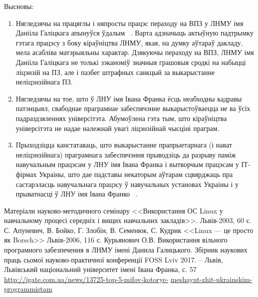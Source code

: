 \documentclass[10pt, a5paper]{article}
\begin{document}
Высновы:

\begin{enumerate}
  \item Нягледзячы на працяглы і няпросты працэс пераходу на ВПЗ у ЛНМУ імя Данііла Галіцкага апынуўся ўдалым ~\cite{Zlobin-3}. Варта адзначыць актыўную падтрымку гэтага працэсу з боку кіраўніцтва ЛНМУ, якая, на думку аўтараў дакладу, мела асабліва матэрыяльны характар. Дзякуючы пераходу на ВПЗ, ЛНМУ імя Данііла Галіцкага не толькі зэканоміў значныя грашовыя сродкі на набыцці ліцэнзій на ПЗ, але і пазбег \linebreak штрафных санкцый за выкарыстанне неліцэнзійнага ПЗ.
  \item Нягледзячы на тое, што ў ЛНУ імя Івана Франка ёсць неабходны кадравы патэнцыял, свабоднае праграмнае забеспячэнне выкарыстоўваецца не ва ўсіх падраздзяленнях універсітэта. Абумоўлена гэта тым, што кіраўніцтва універсітэта не надае належнай увагі ліцэнзійнай чысціні  праграм.
  \item Прыходзіцца канстатаваць, што выкарыстанне прапрыетарнага (і нават неліцэнзійнага) праграмнага забеспячэння прыводзіць да разрыву паміж навучальным працэсам у ЛНУ імя Івана Франка і вытворчым працэсам у ІТ-фірмах Украіны, што дае падставы некаторым аўтарам сцвярджаць пра састарэласць навучальнага працэсу ў навучальных установах Украіны і у прыватнасці ў ЛНУ імя Івана Франко ~\cite{Zlobin-4}.
\end{enumerate}

\begin{thebibliography}{20}

Матеріали науково-методичного семінару <<Використання ОС Linux у навчальному процесі середніх і вищих навчальних закладів>>. Львів-2003, 60 с.
С. Апуневич, В. Бойко, Г. Злобін, В. Семенюк, С. Кудрик <<Linux — це просто як Borsch>> Львів-2006, 116 с.
Курьянович О.В. Використання вільного програмного забезпечення в ЛНМУ імені Данила Галицького. Збірник наукових праць  сьомої науково-практичної конференції FOSS Lviv 2017. -- Львів, Львівський національний університет імені Івана Франка, с. 57
 \url{http://igate.com.ua/news/13725-top-5-mifov-kotorye-} \url{meshayut-zhit-ukrainskim-programmistam}
\end{thebibliography}
\end{document}

